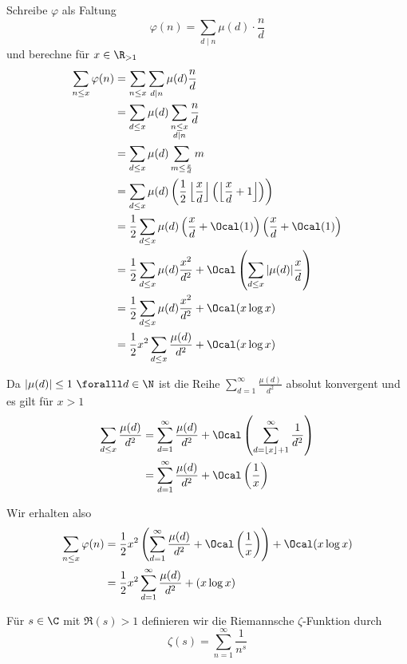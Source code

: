 \begin{idee*}
	Schreibe $\varphi$ als Faltung
	\[ \varphi(n) = \sum_{d \mid n} \mu(d) \cdot \frac{n}{d} \]
	und berechne für $x \in \R_{> 1}$
	\begin{align*}
		\sum_{n\leq x} \varphi(n) &= \sum_{n\leq x} \sum_{d \mid n} \mu(d) \frac{n}{d}\\
			&= \sum_{d \leq x} \mu(d) \sum_{\substack{n \leq x\\d \mid n}} \frac{n}{d}\\
			&= \sum_{d \leq x} \mu(d) \sum_{m \leq \frac{x}{d}} m\\
			&= \sum_{d \leq x} \mu(d) \left( \frac{1}{2} \left\lfloor \frac{x}{d} \right\rfloor \left( \left\lfloor \frac{x}{d} + 1 \right\rfloor \right) \right)\\
			&= \frac{1}{2} \sum_{d \leq x} \mu(d) \left( \frac{x}{d} + \Ocal(1) \right) \left( \frac{x}{d} + \Ocal(1) \right)\\
			&= \frac{1}{2} \sum_{d \leq x} \mu(d) \frac{x^2}{d^2} + \Ocal \left( \sum_{d \leq x} |\mu(d)| \frac{x}{d} \right)\\
			&= \frac{1}{2} \sum_{d \leq x} \mu(d) \frac{x^2}{d^2} + \Ocal (x \log x)\\
			&= \frac{1}{2} x^2 \sum_{d \leq x} \frac{\mu(d)}{d^2} + \Ocal(x \log x)
	\end{align*}
\end{idee*}

\begin{rem*}
	Da $|\mu(d)| \leq 1 \ \foralll d \in \N$ ist die Reihe \( \sum_{d=1}^\infty \frac{\mu(d)}{d^2} \) absolut konvergent und es gilt für $x>1$
	\begin{align*}
		\sum_{d \leq x} \frac{\mu(d)}{d^2} &= \sum_{d=1}^\infty \frac{\mu(d)}{d^2} + \Ocal \left( \sum_{d = \lfloor x \rfloor + 1}^\infty \frac{1}{d^2} \right)\\
		&= \sum_{d=1}^\infty \frac{\mu(d)}{d^2} + \Ocal \left( \frac{1}{x} \right)
	\end{align*}
\end{rem*}

Wir erhalten also
\begin{align*}
	\sum_{n \leq x} \varphi(n) &= \frac{1}{2} x^2 \left( \sum_{d=1}^\infty \frac{\mu(d)}{d^2} + \Ocal \left( \frac{1}{x} \right) \right) + \Ocal (x\log x)\\
	&= \frac{1}{2} x^2 \sum_{d=1}^\infty \frac{\mu(d)}{d^2} + (x\log x)
\end{align*}

\begin{defn*} 
	Für $s \in \C$ mit $\Re(s) > 1$ definieren wir die Riemannsche $\zeta$-Funktion durch
	\[ \zeta(s) = \sum_{n=1}^\infty \frac{1}{n^s} \]
\end{defn*}

